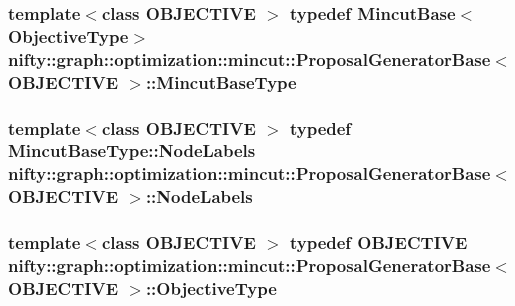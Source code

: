 \subsubsection[{Mincut\+Base\+Type}]{\setlength{\rightskip}{0pt plus 5cm}template$<$class O\+B\+J\+E\+C\+T\+I\+V\+E $>$ typedef {\bf Mincut\+Base}$<${\bf Objective\+Type}$>$ {\bf nifty\+::graph\+::optimization\+::mincut\+::\+Proposal\+Generator\+Base}$<$ O\+B\+J\+E\+C\+T\+I\+V\+E $>$\+::{\bf Mincut\+Base\+Type}}\label{classnifty_1_1graph_1_1optimization_1_1mincut_1_1ProposalGeneratorBase_aa0e35cfcd2a6f657cc49c319f9f471a0}
\hypertarget{classnifty_1_1graph_1_1optimization_1_1mincut_1_1ProposalGeneratorBase_a7d708f82cab20149a88eefada79a23b0}{}
\subsubsection[{Node\+Labels}]{\setlength{\rightskip}{0pt plus 5cm}template$<$class O\+B\+J\+E\+C\+T\+I\+V\+E $>$ typedef Mincut\+Base\+Type\+::\+Node\+Labels {\bf nifty\+::graph\+::optimization\+::mincut\+::\+Proposal\+Generator\+Base}$<$ O\+B\+J\+E\+C\+T\+I\+V\+E $>$\+::{\bf Node\+Labels}}\label{classnifty_1_1graph_1_1optimization_1_1mincut_1_1ProposalGeneratorBase_a7d708f82cab20149a88eefada79a23b0}
\hypertarget{classnifty_1_1graph_1_1optimization_1_1mincut_1_1ProposalGeneratorBase_a24d5eabaefc534df63239cbd61b114b0}{}
\subsubsection[{Objective\+Type}]{\setlength{\rightskip}{0pt plus 5cm}template$<$class O\+B\+J\+E\+C\+T\+I\+V\+E $>$ typedef O\+B\+J\+E\+C\+T\+I\+V\+E {\bf nifty\+::graph\+::optimization\+::mincut\+::\+Proposal\+Generator\+Base}$<$ O\+B\+J\+E\+C\+T\+I\+V\+E $>$\+::{\bf Objective\+Type}}\label{classnifty_1_1graph_1_1optimization_1_1mincut_1_1ProposalGeneratorBase_a24d5eabaefc534df63239cbd61b114b0}


